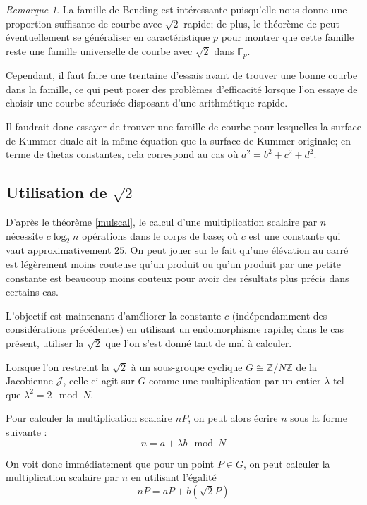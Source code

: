 \documentclass[a4paper,12pt]{article}
\theoremstyle{definition}
\theoremstyle{remark}
\newtheorem{remarque}{Remarque}
\numberwithin{equation}{section}
\begin{document}
\begin{remarque}
La famille de Bending est intéressante puisqu'elle nous donne une proportion suffisante de courbe avec $\sqrt{2}$ rapide; de plus, le théorème de \citep{bending} peut éventuellement se généraliser en caractéristique $p$ pour montrer que cette famille reste une famille universelle de courbe avec $\sqrt{2}$ dans $\mathbb{F}_p$.

Cependant, il faut faire une trentaine d'essais avant de trouver une bonne courbe dans la famille, ce qui peut poser des problèmes d'efficacité lorsque l'on essaye de choisir une courbe sécurisée disposant d'une arithmétique rapide.

Il faudrait donc essayer de trouver une famille de courbe pour lesquelles la surface de Kummer duale ait la même équation que la surface de Kummer originale; en terme de thetas constantes, cela correspond au cas où $a^2 = b^2 + c^2 + d^2$.
\end{remarque}


\subsection{Utilisation de \texorpdfstring{$\sqrt{2}$}{sqrt2}}

D'après le théorème \ref{mulscal}, le calcul d'une multiplication scalaire par $n$ nécessite $c \log_2 n$ opérations dans le corps de base; où $c$ est une constante qui vaut approximativement $25$. On peut jouer sur le fait qu'une élévation au carré est légèrement moins couteuse qu'un produit ou qu'un produit par une petite constante est beaucoup moins couteux pour avoir des résultats plus précis dans certains cas.

L'objectif est maintenant d'améliorer la constante $c$ (indépendamment des considérations précédentes) en utilisant un endomorphisme rapide; dans le cas présent, utiliser la $\sqrt{2}$ que l'on s'est donné tant de mal à calculer.

Lorsque l'on restreint la $\sqrt{2}$ à un sous-groupe cyclique $G \cong \mathbb{Z}/N\mathbb{Z}$ de la Jacobienne $\mathcal{J}$, celle-ci agit sur $G$ comme une multiplication par un entier $\lambda$ tel que $\lambda^2 = 2 \mod N$.

Pour calculer la multiplication scalaire $nP$, on peut alors écrire $n$ sous la forme suivante :
$$ n = a + \lambda b \mod N$$

On voit donc immédiatement que pour un point $P \in G$, on peut calculer la multiplication scalaire par $n$ en utilisant l'égalité
$$nP = aP + b(\sqrt{2}P)$$
\end{document}
